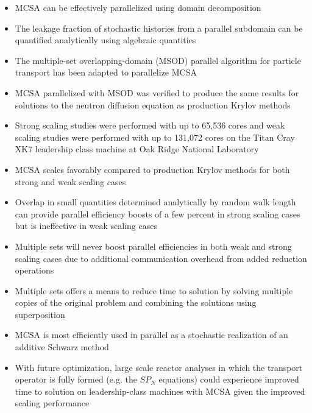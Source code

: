 \begin{itemize}
\item MCSA can be effectively parallelized using domain decomposition
\item The leakage fraction of stochastic histories from a parallel
  subdomain can be quantified analytically using algebraic quantities
\item The multiple-set overlapping-domain (MSOD) parallel algorithm
  for particle transport has been adapted to parallelize MCSA
\item MCSA parallelized with MSOD was verified to produce the same
  results for solutions to the neutron diffusion equation as
  production Krylov methods
\item Strong scaling studies were performed with up to 65,536 cores
  and weak scaling studies were performed with up to 131,072 cores on
  the Titan Cray XK7 leadership class machine at Oak Ridge National
  Laboratory
\item MCSA scales favorably compared to production Krylov methods for
  both strong and weak scaling cases
\item Overlap in small quantities determined analytically by random
  walk length can provide parallel efficiency boosts of a few percent
  in strong scaling cases but is ineffective in weak scaling cases
\item Multiple sets will never boost parallel efficiencies in both
  weak and strong scaling cases due to additional communication
  overhead from added reduction operations
\item Multiple sets offers a means to reduce time to solution by
  solving multiple copies of the original problem and combining the
  solutions using superposition
\item MCSA is most efficiently used in parallel as a stochastic
  realization of an additive Schwarz method
\item With future optimization, large scale reactor analyses in which
  the transport operator is fully formed (e.g. the $SP_N$ equations)
  could experience improved time to solution on leadership-class
  machines with MCSA given the improved scaling performance
\end{itemize}
